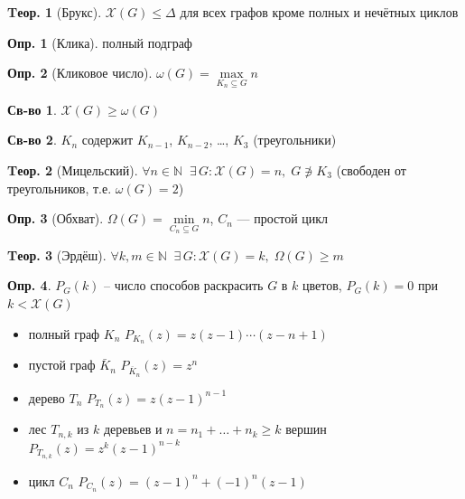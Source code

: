 \documentclass[a4paper,12pt]{article}
\theoremstyle{definition}
\newtheorem{definition}{Опр.}[section]
\newtheorem*{property}{Св-во}  %
\theoremstyle{definition}
\newtheorem{theorem}{Tеор.}[section]
\def\iiChi{\mathcal{X}}
\begin{document}
\begin{theorem}[Брукс]
	$\iiChi(G) \leqslant \Delta$ для всех графов кроме полных и нечётных циклов
\end{theorem}

\begin{definition}[Клика] полный подграф \end{definition}

\begin{definition}[Кликовое число]
	$ \omega(G) = \max \limits_{K_n \subseteq G} n $
\end{definition}

\begin{property} $ \iiChi(G) \geqslant \omega(G) $ \end{property}

\begin{property} $K_n$ содержит $K_{n-1}$, $K_{n-2}$, \dots, $K_3$ (треугольники) \end{property}

\begin{theorem}[Мицельский]
	$\forall n \in \mathbb{N} \;\; \exists \, G: \iiChi(G)=n, \; G \not\owns K_3$
	(свободен от треугольников, т.е. $\omega(G)=2$)
\end{theorem}

\begin{definition}[Обхват]
	$\Omega(G) = \min \limits_{C_n \subseteq G} n $, $C_n$ --- простой цикл
\end{definition}

\begin{theorem}[Эрдёш]
	$\forall k,m \in \mathbb{N} \;\; \exists \, G: \iiChi(G)=k, \; \Omega(G) \geqslant m$
\end{theorem}

\begin{definition}
	$P_G(k)$ -- число способов раскрасить $G$ в $k$ цветов, $P_G(k)=0$ при $k<\iiChi(G)$
\end{definition}

\begin{itemize}
	\item полный граф $K_n$ \quad $P_{K_n}(z) = z(z-1)\cdots(z-n+1)$
	\item пустой граф $\bar{K}_n$ \quad $P_{\overline{K}_n}(z) = z^n$
	\item дерево $T_n$ \quad $P_{T_n}(z) = z(z-1)^{n-1}$
	\item лес $T_{n,k}$ из $k$ деревьев и $n=n_1+\dots+n_k \geqslant k$ вершин \quad $P_{T_{n,k}}(z) = z^k(z-1)^{n-k}$
	\item цикл $C_{n}$ \quad $P_{C_{n}}(z) = (z-1)^n + (-1)^n(z-1)$
\end{itemize}
\end{document}

